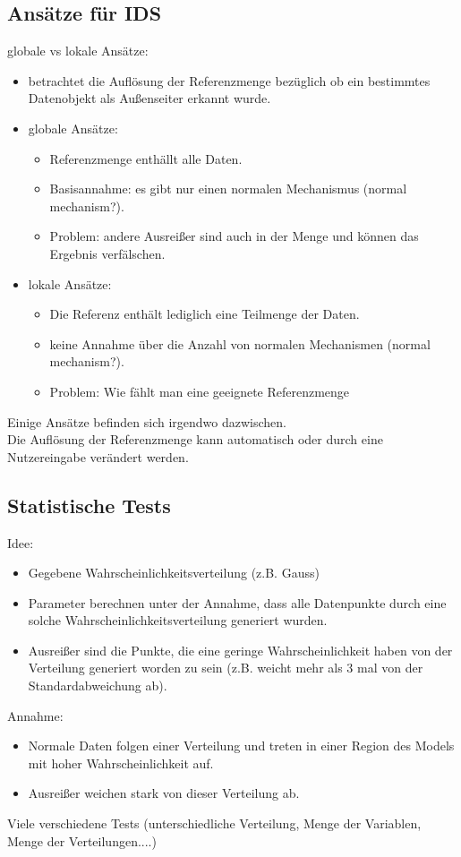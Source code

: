 \documentclass{article} %
\begin{document}
\subsection{Ansätze für IDS}
globale vs lokale Ansätze:
\begin{itemize}
	\item betrachtet die Auflösung der Referenzmenge bezüglich ob ein bestimmtes Datenobjekt als Außenseiter erkannt wurde.
    \item globale Ansätze:
    
    \begin{itemize}
        \item Referenzmenge enthällt alle Daten.
        \item Basisannahme: es gibt nur einen normalen Mechanismus (normal mechanism?).
        \item Problem: andere Ausreißer sind auch in der Menge und können das Ergebnis verfälschen.
    \end{itemize}
    \item lokale Ansätze:
    
    \begin{itemize}
        \item Die Referenz enthält lediglich eine Teilmenge der Daten.
        \item keine Annahme über die Anzahl von normalen Mechanismen (normal mechanism?).
        \item Problem: Wie fählt man eine geeignete Referenzmenge
    \end{itemize}
\end{itemize}
Einige Ansätze befinden sich irgendwo dazwischen.\\
Die Auflösung der Referenzmenge kann automatisch oder durch eine Nutzereingabe verändert werden.
\subsection{Statistische Tests}
Idee:
\begin{itemize}
	\item Gegebene Wahrscheinlichkeitsverteilung (z.B. Gauss)
    \item Parameter berechnen unter der Annahme, dass alle Datenpunkte durch eine solche Wahrscheinlichkeitsverteilung generiert wurden.
    \item Ausreißer sind die Punkte, die eine geringe Wahrscheinlichkeit haben von der Verteilung generiert worden zu sein (z.B. weicht mehr als 3 mal von der Standardabweichung ab).
\end{itemize}
Annahme:
\begin{itemize}
	\item Normale Daten folgen einer Verteilung und treten in einer Region des Models mit hoher Wahrscheinlichkeit auf.
    \item Ausreißer weichen stark von dieser Verteilung ab.
\end{itemize}
Viele verschiedene Tests (unterschiedliche Verteilung, Menge der Variablen, Menge der Verteilungen....)\\
\end{document}
